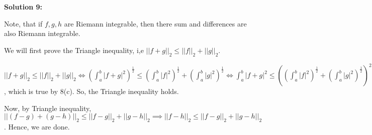 \documentclass[11pt]{amsart}
\theoremstyle{definition}
\begin{document}
\textbf{Solution 9:}

Note, that if $f,g,h$ are Riemann integrable, then there sum and differences are also Riemann integrable.

We will first prove the Triangle inequality, i,e $||f + g||_2 \le ||f||_2 + ||g||_2$.

$||f + g||_2 \le ||f||_2 + ||g||_2 \iff (\int_a^b |f+g|^2)^{\frac{1}{2}} \le (\int_a^b |f|^2)^{\frac{1}{2}} + (\int_a^b |g|^2)^{\frac{1}{2}} \iff \int_a^b |f+g|^2 \le ((\int_a^b |f|^2)^{\frac{1}{2}} + (\int_a^b |g|^2)^{\frac{1}{2}})^2 \iff \int_a^b |f|^2 + \int_a^b |g|^2 + 2 \int_a^b |fg| \le \int_a^b |f|^2 + \int_a^b |g|^2 + 2 (\int_a^b |f|^2)^{\frac{1}{2}}.(\int_a^b |g|^2)^{\frac{1}{2}} \iff \int_a^b |fg| \le (\int_a^b |f|^2)^{\frac{1}{2}}.(\int_a^b |g|^2)^{\frac{1}{2}}$, which is true by 8(c). So, the Triangle inequality holds.

Now, by Triangle inequality, $||(f-g) + (g-h)||_2 \le ||f-g||_2 + ||g-h||_2 \implies ||f-h||_2 \le ||f-g||_2 + ||g-h||_2$. Hence, we are done.
\end{document}
